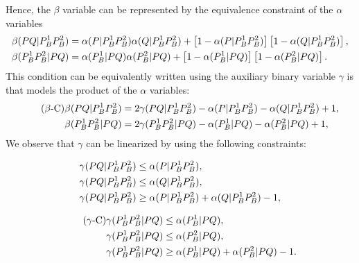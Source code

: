 \documentclass[a4paper]{elsarticle}
\begin{document}
	Hence, the $\beta$ variable can be represented by the equivalence constraint of the $\alpha$ variables
	\begin{align*}%
		\betamas{P}{Q}{P_B^1}{P_B^2}&=\alphamas{P}{P_B^1}{P_B^2}\alphamas{Q}{P_B^1}{P_B^2} + \left[1-\alphamas{P}{P_B^1}{P_B^2}\right]\left[1-\alphamas{Q}{P_B^1}{P_B^2}\right],\\
		\betamas{P_B^1}{P_B^2}{P}{Q}&=\alphamas{P_B^1}{P}{Q}\alphamas{P_B^2}{P}{Q} + \left[1-\alphamas{P_B^1}{P}{Q}\right]\left[1-\alphamas{P_B^2}{P}{Q}\right].
	\end{align*}
	This condition can be equivalently written using the auxiliary binary variable $\gamma$ is  that models the product of the $\alpha$ variables:
	\begin{align*}\tag{$\beta$-C}\label{eq:betaC}
		\beta(PQ|P_B^1P_B^2)&=2\gamma(PQ|P_B^1P_B^2) -\alpha(P|P_B^1P_B^2)-\alpha(Q|P_B^1P_B^2)+1,\\
		\beta(P_B^1P_B^2|PQ)&=2\gamma(P_B^1P_B^2|PQ) -\alpha(P_B^1|PQ)-\alpha(P_B^2|PQ)+1,
	\end{align*}
	We observe that $\gamma$ can be linearized by using the following constraints:
	
	\begin{minipage}{.5\linewidth}
	\begin{align*}
		\gamma(PQ|P_B^1P_B^2) & \leq \alpha(P|P_B^1P_B^2),\\
		\gamma(PQ|P_B^1P_B^2) & \leq \alpha(Q|P_B^1P_B^2),\\
		\gamma(PQ|P_B^1P_B^2) & \geq \alpha(P|P_B^1P_B^2) + \alpha(Q|P_B^1P_B^2) - 1,
	\end{align*}
	\end{minipage}
	\begin{minipage}{.5\linewidth}
	\begin{align*}\tag{$\gamma$-C}\label{eq:gammaC}
		\gamma(P_B^1P_B^2|PQ) & \leq \alpha(P_B^1|PQ),\\
		\gamma(P_B^1P_B^2|PQ) & \leq \alpha(P_B^2|PQ),\\
		\gamma(P_B^1P_B^2|PQ) & \geq \alpha(P_B^1|PQ) + \alpha(P_B^2|PQ) - 1.
	\end{align*}
	\end{minipage}

	\bigskip
	
	\newcommand{\deltacheck}[4]{\delta(#1#2|#3#4)}
	
\end{document}
